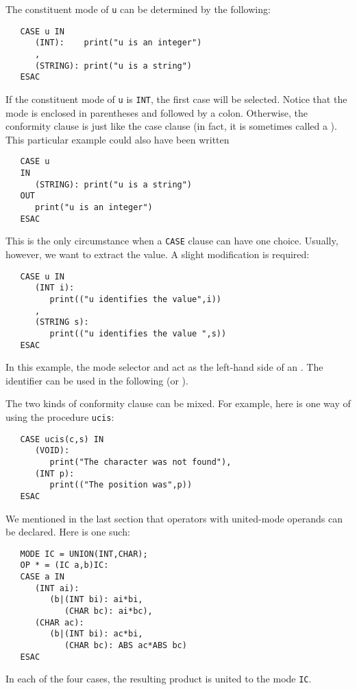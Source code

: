 The constituent mode of \verb|u| can be determined by the following:
\begin{verbatim}
   CASE u IN
      (INT):    print("u is an integer")
      ,
      (STRING): print("u is a string")
   ESAC
\end{verbatim}
\noindent
If the constituent mode of \verb|u| is \verb|INT|, the first case
will be selected. Notice that the mode 
is enclosed in parentheses and followed by a colon.  Otherwise, the
conformity clause is just like the case clause (in fact, it is
sometimes called a ).  This particular
example could also have been written
\begin{verbatim}
   CASE u
   IN
      (STRING): print("u is a string")
   OUT
      print("u is an integer")
   ESAC
\end{verbatim}
\noindent
This is the only circumstance when a \verb|CASE| clause can have one
choice. Usually, however, we want to extract the value. A slight
modification is required:
\begin{verbatim}
   CASE u IN
      (INT i):
         print(("u identifies the value",i))
      ,
      (STRING s):
         print(("u identifies the value ",s))
   ESAC
\end{verbatim}
\noindent
In this example, the mode selector and  act as the
left-hand side of an
.
The identifier can be used in the following  (or
).

The two kinds of conformity clause can be mixed. For example, here is
one way of using the procedure \verb|ucis|:
\begin{verbatim}
   CASE ucis(c,s) IN
      (VOID):
         print("The character was not found"),
      (INT p):
         print(("The position was",p))
   ESAC
\end{verbatim}

We mentioned in the last section that operators with united-mode
operands can be declared. Here is one such:
\begin{verbatim}
   MODE IC = UNION(INT,CHAR);
   OP * = (IC a,b)IC:
   CASE a IN
      (INT ai):
         (b|(INT bi): ai*bi,
            (CHAR bc): ai*bc),
      (CHAR ac):
         (b|(INT bi): ac*bi,
            (CHAR bc): ABS ac*ABS bc)
   ESAC
\end{verbatim}
\noindent
In each of the four cases, the resulting product is united to the mode
\verb|IC|.

